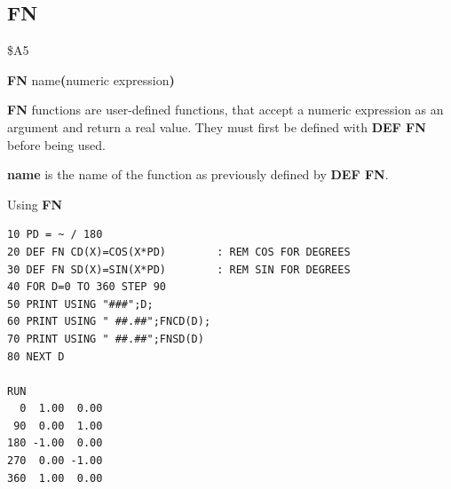 
\newpage
\subsection{FN}
\begin{description}[leftmargin=2cm,style=nextline]
\item [Token:]    \$A5

\item [Format:]   {\bf FN} name{\bf(}numeric expression{\bf)}

\item [Usage:]    {\bf FN} functions are user-defined functions, that accept a numeric expression as an argument and return a real value.
                  They must first be defined with {\bf DEF FN} before being used.

                  {\bf name} is the name of the function as previously defined by {\bf DEF FN}.

\item [Example:]  Using {\bf FN}

\begin{tcolorbox}[colback=black,coltext=white]
\verbatimfont{\codefont}
\begin{verbatim}
10 PD = ~ / 180
20 DEF FN CD(X)=COS(X*PD)        : REM COS FOR DEGREES
30 DEF FN SD(X)=SIN(X*PD)        : REM SIN FOR DEGREES
40 FOR D=0 TO 360 STEP 90
50 PRINT USING "###";D;
60 PRINT USING " ##.##";FNCD(D);
70 PRINT USING " ##.##";FNSD(D)
80 NEXT D

RUN
  0  1.00  0.00
 90  0.00  1.00
180 -1.00  0.00
270  0.00 -1.00
360  1.00  0.00
\end{verbatim}
\end{tcolorbox}
\end{description}


\newpage
